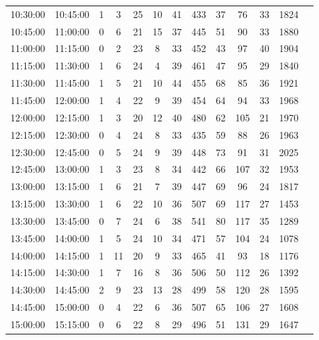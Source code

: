 \begin{table}[h!]
\begin{tabular}{ccccccccccccc}
        10:30:00 & 10:45:00 & 1 & 3 & 25 & 10 & 41 & 433 & 37 & 76 & 33 & 1824 \\
        10:45:00 & 11:00:00 & 0 & 6 & 21 & 15 & 37 & 445 & 51 & 90 & 33 & 1880 \\
        11:00:00 & 11:15:00 & 0 & 2 & 23 & 8 & 33 & 452 & 43 & 97 & 40 & 1904 \\
        11:15:00 & 11:30:00 & 1 & 6 & 24 & 4 & 39 & 461 & 47 & 95 & 29 & 1840 \\
        11:30:00 & 11:45:00 & 1 & 5 & 21 & 10 & 44 & 455 & 68 & 85 & 36 & 1921 \\
        11:45:00 & 12:00:00 & 1 & 4 & 22 & 9 & 39 & 454 & 64 & 94 & 33 & 1968 \\
        12:00:00 & 12:15:00 & 1 & 3 & 20 & 12 & 40 & 480 & 62 & 105 & 21 & 1970 \\
        12:15:00 & 12:30:00 & 0 & 4 & 24 & 8 & 33 & 435 & 59 & 88 & 26 & 1963 \\
        12:30:00 & 12:45:00 & 0 & 5 & 24 & 9 & 39 & 448 & 73 & 91 & 31 & 2025 \\
        12:45:00 & 13:00:00 & 1 & 3 & 23 & 8 & 34 & 442 & 66 & 107 & 32 & 1953 \\
        13:00:00 & 13:15:00 & 1 & 6 & 21 & 7 & 39 & 447 & 69 & 96 & 24 & 1817 \\
        13:15:00 & 13:30:00 & 1 & 6 & 22 & 10 & 36 & 507 & 69 & 117 & 27 & 1453 \\
        13:30:00 & 13:45:00 & 0 & 7 & 24 & 6 & 38 & 541 & 80 & 117 & 35 & 1289 \\
        13:45:00 & 14:00:00 & 1 & 5 & 24 & 10 & 34 & 471 & 57 & 104 & 24 & 1078 \\
        14:00:00 & 14:15:00 & 1 & 11 & 20 & 9 & 33 & 465 & 41 & 93 & 18 & 1176 \\
        14:15:00 & 14:30:00 & 1 & 7 & 16 & 8 & 36 & 506 & 50 & 112 & 26 & 1392 \\
        14:30:00 & 14:45:00 & 2 & 9 & 23 & 13 & 28 & 499 & 58 & 120 & 28 & 1595 \\
        14:45:00 & 15:00:00 & 0 & 4 & 22 & 6 & 36 & 507 & 65 & 106 & 27 & 1608 \\
        15:00:00 & 15:15:00 & 0 & 6 & 22 & 8 & 29 & 496 & 51 & 131 & 29 & 1647 \\
        \bottomrule
    \end{tabular}
\end{table}

\clearpage

